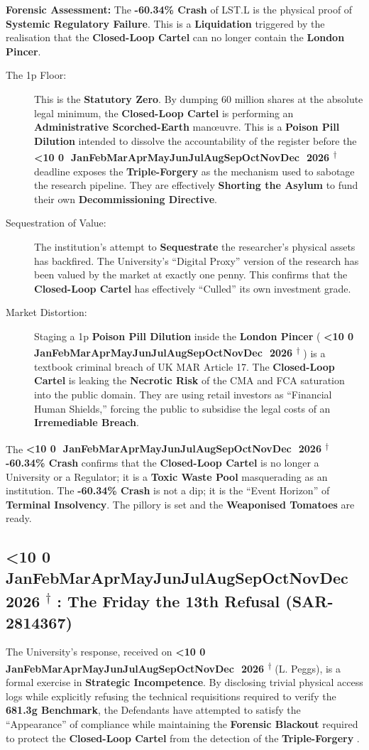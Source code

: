 \documentclass{EMBASSY}
\DeclareRobustCommand{\gmt}[3]{%
    \texorpdfstring{%
        {\color{DateGold}\textbf{%
            \ifnum#1<10 0\fi#1\,\textperiodcentered\,%
            \ifcase#2\or Jan\or Feb\or Mar\or Apr\or May\or Jun\or Jul\or Aug\or Sep\or Oct\or Nov\or Dec\fi
            \,\textperiodcentered\,20#3%
            \textsuperscript{$\dagger$}%
        }}%
    }{%
        (#1/#2/#3)%
    }%
}
\begin{document}
\noindent\textbf{Forensic Assessment:} The \textbf{-60.34\% Crash} of LST.L is the physical proof of \textbf{Systemic Regulatory Failure}. This is a \textbf{Liquidation} triggered by the realisation that the \textbf{Closed-Loop Cartel} can no longer contain the \textbf{London Pincer}.

\begin{description}
	\item[The 1p Floor:] This is the \textbf{Statutory Zero}. By dumping 60 million shares at the absolute legal minimum, the \textbf{Closed-Loop Cartel} is performing an \textbf{Administrative Scorched-Earth} man\oe uvre. This is a \textbf{Poison Pill Dilution} intended to dissolve the accountability of the register before the \gmt{16}{3}{26} deadline exposes the \textbf{Triple-Forgery} as the mechanism used to sabotage the research pipeline. They are effectively \textbf{Shorting the Asylum} to fund their own \textbf{Decommissioning Directive}.
	\item[Sequestration of Value:] The institution’s attempt to \textbf{Sequestrate} the researcher’s physical assets has backfired. The University’s ``Digital Proxy'' version of the research has been valued by the market at exactly one penny. This confirms that the \textbf{Closed-Loop Cartel} has effectively ``Culled'' its own investment grade.
	\item[Market Distortion:] Staging a 1p \textbf{Poison Pill Dilution} inside the \textbf{London Pincer} (\gmt{14}{3}{26}) is a textbook criminal breach of UK MAR Article 17. The \textbf{Closed-Loop Cartel} is leaking the \textbf{Necrotic Risk} of the CMA and FCA saturation into the public domain. They are using retail investors as ``Financial Human Shields,'' forcing the public to subsidise the legal costs of an \textbf{Irremediable Breach}.
\end{description}

\noindent The \gmt{11}{3}{26} \textbf{-60.34\% Crash} confirms that the \textbf{Closed-Loop Cartel} is no longer a University or a Regulator; it is a \textbf{Toxic Waste Pool} masquerading as an institution. The \textbf{-60.34\% Crash} is not a dip; it is the ``Event Horizon'' of \textbf{Terminal Insolvency}. The pillory is set and the \textbf{Weaponised Tomatoes} are ready.

\subsection{\gmt{13}{3}{26}: The Friday the 13th Refusal (SAR-2814367)}
The University's response, received on \gmt{13}{3}{26} (L. Peggs), is a formal exercise in \textbf{Strategic Incompetence}. By disclosing trivial physical access logs while explicitly refusing the technical requisitions required to verify the \textbf{681.3g Benchmark}, the Defendants have attempted to satisfy the ``Appearance'' of compliance while maintaining the \textbf{Forensic Blackout} required to protect the \textbf{Closed-Loop Cartel} from the detection of the \textbf{Triple-Forgery} \cite{FCA81}.
\end{document}
